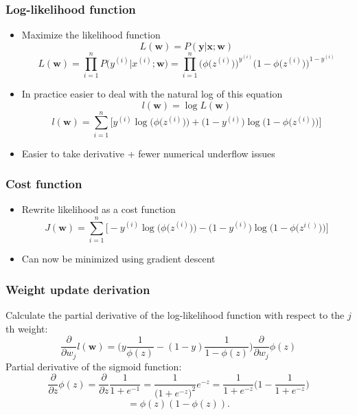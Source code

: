 \documentclass{beamer}
\begin{document}
\begin{frame}
  \frametitle{Log-likelihood function}
  \begin{itemize}
  \item Maximize the likelihood function
    \[
    L(\mathbf{w}) = P(\mathbf{y} | \mathbf{x}; \mathbf{w})
    \]
    \[
    L(\mathbf{w}) = \prod_{i=1}^{n} P \big( y^{(i)} | x^{(i)}; \mathbf{w} \big) =  \prod_{i=1}^{n} \bigg( \phi \big(z^{(i)} \big) \bigg) ^ {y^{(i)}} \bigg( 1 - \phi \big( z^{(i)} \big) \bigg)^{1-y^{(i)}}
    \]
  \item In practice easier to deal with the natural log of this equation
    \[
    l(\mathbf{w}) = \log L(\mathbf{w})
    \]
    \[
    l(\mathbf{w}) = \sum_{i=1}^{n} \Bigg[ y^{(i)} \log \bigg(\phi \big( z^{(i)} \big) \bigg) + \bigg(1 - y^{(i)} \bigg) \log \bigg( 1 - \phi \big( z^{(i)} \big) \bigg)  \Bigg]
    \]
    \item Easier to take derivative + fewer numerical underflow issues
  \end{itemize}
\end{frame}

\begin{frame}
  \frametitle{Cost function}
  \begin{itemize}
  \item Rewrite likelihood as a cost function
    \[
    J(\mathbf{w}) = \sum_{i=1}^{n} \Bigg[- y^{(i)} \log \bigg(\phi \big( z^{(i)} \big) \bigg) - \bigg(1 - y^{(i)} \bigg) \log \bigg( 1 - \phi \big( z^{i()} \big) \bigg)  \Bigg]
    \]
  \item Can now be minimized using gradient descent
  \end{itemize} \href{https://github.com/rasbt/python-machine-learning-book/blob/master/code/ch03/ch03.ipynb}{}
\end{frame}

\begin{frame}
  \frametitle{Weight update derivation}
  Calculate the partial derivative of the log-likelihood function with respect to the $j$th weight:
  \[
  \frac{\partial}{\partial w_j} l(\mathbf{w}) = \Bigg( y \frac{1}{\phi(z)}  - (1-y) \frac{1}{1-\phi(z)}   \Bigg)   \frac{\partial}{\partial w_j} \phi(z)
  \]
  Partial derivative of the sigmoid function:
  \[
  \frac{\partial}{\partial z} \phi(z) = \frac{\partial}{\partial z} \frac{1}{1 + e^{-1}} = \frac{1}{\big( 1 + e^{-z}\big)^2} e^{-z} = \frac{1}{1 + e^{-z}} \bigg( 1 - \frac{1}{1 + e^{-z}} \bigg)
  \]
  \[
  = \phi(z)(1-\phi(z)).
  \]
\end{frame}
\end{document}
